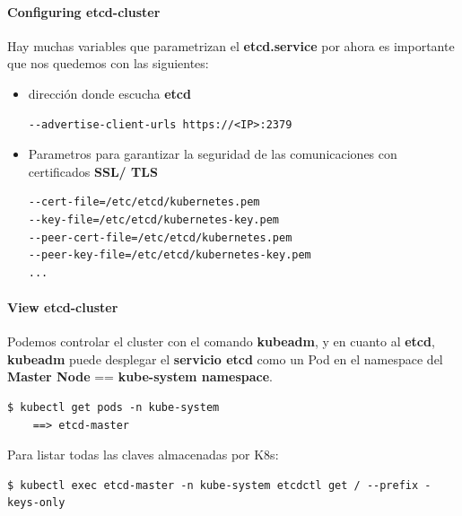 \documentclass{article}
\newenvironment{codetemplate}[1][]{%
  \mybasecolorbox[#1]
  \itshape
}{%
  \endmybasecolorbox
}
\begin{document}
\paragraph{Configuring etcd-cluster}

Hay muchas variables que parametrizan el \textbf{etcd.service} por ahora es importante que nos quedemos con las siguientes: 

\begin{itemize}
    \item dirección donde escucha \textbf{etcd}
\begin{codetemplate}{}
\begin{verbatim}
--advertise-client-urls https://<IP>:2379
\end{verbatim}
\end{codetemplate}

    \item Parametros para garantizar la seguridad de las comunicaciones con certificados \textbf{SSL/ TLS}
\begin{codetemplate}{}
\begin{verbatim}
--cert-file=/etc/etcd/kubernetes.pem
--key-file=/etc/etcd/kubernetes-key.pem
--peer-cert-file=/etc/etcd/kubernetes.pem
--peer-key-file=/etc/etcd/kubernetes-key.pem
...
\end{verbatim}
\end{codetemplate}


\end{itemize}

\paragraph{View etcd-cluster}

Podemos controlar el cluster con el comando \textbf{kubeadm}, y en cuanto al \textbf{etcd}, \textbf{kubeadm} puede desplegar el \textbf{servicio etcd} como un Pod en el namespace del \textbf{Master Node} == \textbf{kube-system namespace}.

\begin{codetemplate}{}
\begin{verbatim}
$ kubectl get pods -n kube-system
    ==> etcd-master
\end{verbatim}
\end{codetemplate}

Para listar todas las claves almacenadas por K8s:

\begin{codetemplate}{}
\begin{verbatim}
$ kubectl exec etcd-master -n kube-system etcdctl get / --prefix -keys-only
\end{verbatim}
\end{codetemplate}
\end{document}
